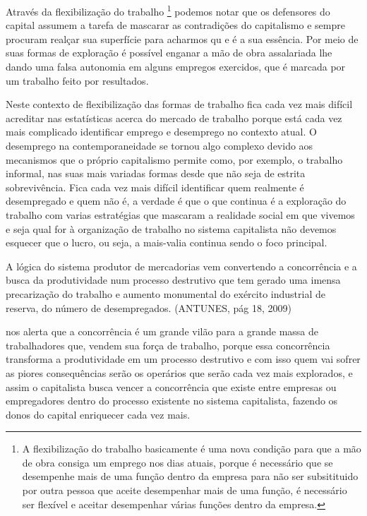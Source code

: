 Através da flexibilização do trabalho \footnote{A flexibilização do trabalho
basicamente é uma nova condição para que a mão de obra consiga um emprego nos
dias atuais, porque é necessário que se desempenhe mais de uma função dentro
da empresa para não ser subsitituido por outra pessoa que aceite desempenhar
mais de uma função, é necessário ser flexível e aceitar desempenhar várias
funções dentro da empresa.} podemos notar que os defensores do capital assumem
a tarefa de mascarar as contradições do capitalismo e sempre procuram realçar
sua superfície para acharmos qu e é a sua essência. Por meio de suas formas de
exploração é possível enganar a mão de obra assalariada lhe dando uma falsa
autonomia em alguns empregos exercidos, que é marcada por um trabalho feito
por resultados.

Neste contexto de flexibilização das formas de trabalho fica cada vez mais
difícil acreditar nas estatísticas acerca do mercado de trabalho porque está
cada vez mais complicado identificar emprego e desemprego no contexto atual. O
desemprego na contemporaneidade se tornou algo complexo devido aos mecanismos
que o próprio capitalismo permite como, por exemplo, o trabalho informal, nas
suas mais variadas formas desde que não seja de estrita sobrevivência. Fica
cada vez mais difícil identificar quem realmente é desempregado e quem não é,
a verdade é que o que continua é a exploração do trabalho com varias
estratégias que mascaram a realidade social em que vivemos e seja qual for à
organização de trabalho no sistema capitalista não devemos esquecer que o
lucro, ou seja, a mais-valia continua sendo o foco principal.

\begin{citacao}
A lógica do sistema produtor de mercadorias vem convertendo a concorrência e a busca da produtividade num processo destrutivo que tem gerado uma imensa precarização do trabalho e aumento monumental do exército industrial de reserva, do número de desempregados. (ANTUNES, pág 18, 2009) 
\end{citacao}

\cite{antunes2009infoproletarios} nos alerta que a concorrência é um grande vilão para a
grande massa de trabalhadores que, vendem sua força de trabalho, porque essa
concorrência transforma a produtividade em um processo destrutivo e com isso
quem vai sofrer as piores consequências serão os operários que serão cada vez
mais explorados, e assim o capitalista busca vencer a concorrência que existe
entre empresas ou empregadores dentro do processo existente no sistema
capitalista, fazendo os donos do capital enriquecer cada vez mais.

